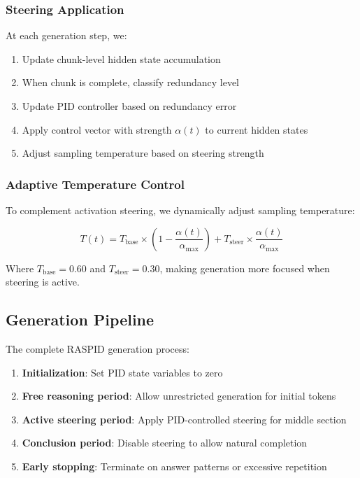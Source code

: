\documentclass{article}
\begin{document}
\subsubsection{Steering Application}

At each generation step, we:

\begin{enumerate}
\item Update chunk-level hidden state accumulation
\item When chunk is complete, classify redundancy level
\item Update PID controller based on redundancy error
\item Apply control vector with strength $\alpha(t)$ to current hidden states
\item Adjust sampling temperature based on steering strength
\end{enumerate}

\subsubsection{Adaptive Temperature Control}

To complement activation steering, we dynamically adjust sampling temperature:

\begin{equation}
T(t) = T_{\text{base}} \times \left(1 - \frac{\alpha(t)}{\alpha_{\max}}\right) + T_{\text{steer}} \times \frac{\alpha(t)}{\alpha_{\max}}
\end{equation}

Where $T_{\text{base}} = 0.60$ and $T_{\text{steer}} = 0.30$, making generation more focused when steering is active.

\subsection{Generation Pipeline}

The complete RASPID generation process:

\begin{enumerate}
\item \textbf{Initialization}: Set PID state variables to zero
\item \textbf{Free reasoning period}: Allow unrestricted generation for initial tokens
\item \textbf{Active steering period}: Apply PID-controlled steering for middle section
\item \textbf{Conclusion period}: Disable steering to allow natural completion
\item \textbf{Early stopping}: Terminate on answer patterns or excessive repetition
\end{enumerate}
\end{document}
